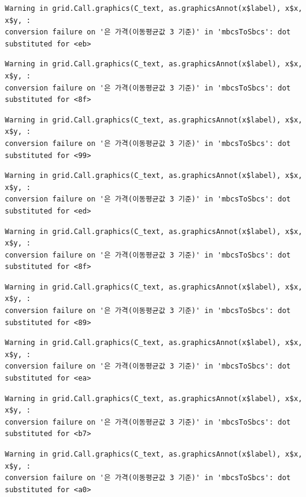 \documentclass[
  letterpaper,
  DIV=11,
  numbers=noendperiod]{scrreprt}
\begin{document}
\begin{verbatim}
Warning in grid.Call.graphics(C_text, as.graphicsAnnot(x$label), x$x, x$y, :
conversion failure on '은 가격(이동평균값 3 기준)' in 'mbcsToSbcs': dot
substituted for <eb>
\end{verbatim}

\begin{verbatim}
Warning in grid.Call.graphics(C_text, as.graphicsAnnot(x$label), x$x, x$y, :
conversion failure on '은 가격(이동평균값 3 기준)' in 'mbcsToSbcs': dot
substituted for <8f>
\end{verbatim}

\begin{verbatim}
Warning in grid.Call.graphics(C_text, as.graphicsAnnot(x$label), x$x, x$y, :
conversion failure on '은 가격(이동평균값 3 기준)' in 'mbcsToSbcs': dot
substituted for <99>
\end{verbatim}

\begin{verbatim}
Warning in grid.Call.graphics(C_text, as.graphicsAnnot(x$label), x$x, x$y, :
conversion failure on '은 가격(이동평균값 3 기준)' in 'mbcsToSbcs': dot
substituted for <ed>
\end{verbatim}

\begin{verbatim}
Warning in grid.Call.graphics(C_text, as.graphicsAnnot(x$label), x$x, x$y, :
conversion failure on '은 가격(이동평균값 3 기준)' in 'mbcsToSbcs': dot
substituted for <8f>
\end{verbatim}

\begin{verbatim}
Warning in grid.Call.graphics(C_text, as.graphicsAnnot(x$label), x$x, x$y, :
conversion failure on '은 가격(이동평균값 3 기준)' in 'mbcsToSbcs': dot
substituted for <89>
\end{verbatim}

\begin{verbatim}
Warning in grid.Call.graphics(C_text, as.graphicsAnnot(x$label), x$x, x$y, :
conversion failure on '은 가격(이동평균값 3 기준)' in 'mbcsToSbcs': dot
substituted for <ea>
\end{verbatim}

\begin{verbatim}
Warning in grid.Call.graphics(C_text, as.graphicsAnnot(x$label), x$x, x$y, :
conversion failure on '은 가격(이동평균값 3 기준)' in 'mbcsToSbcs': dot
substituted for <b7>
\end{verbatim}

\begin{verbatim}
Warning in grid.Call.graphics(C_text, as.graphicsAnnot(x$label), x$x, x$y, :
conversion failure on '은 가격(이동평균값 3 기준)' in 'mbcsToSbcs': dot
substituted for <a0>
\end{verbatim}
\end{document}
